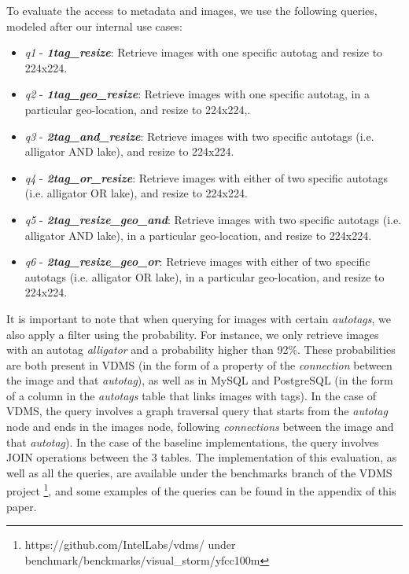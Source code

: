 To evaluate the access to metadata and images,
we use the following queries, modeled after our internal use cases:

\begin{itemize}
\item \textit{q1} - {\bf {\em 1tag\_resize}}: Retrieve images with one specific autotag and resize to 224x224.

\item \textit{q2} - {\bf {\em 1tag\_geo\_resize}}: Retrieve images with one specific autotag, in a particular geo-location, and resize to 224x224,.

\item \textit{q3} - {\bf {\em 2tag\_and\_resize}}: Retrieve images with two specific autotags (i.e. alligator AND lake), and resize to 224x224.

\item \textit{q4} - {\bf {\em 2tag\_or\_resize}}: Retrieve images with either of two specific autotags (i.e. alligator OR lake), and resize to 224x224.

\item \textit{q5} - {\bf {\em 2tag\_resize\_geo\_and}}: Retrieve images with two specific autotags (i.e. alligator AND lake), in a particular geo-location, and resize to 224x224.

\item \textit{q6} - {\bf {\em 2tag\_resize\_geo\_or}}: Retrieve images with either of two specific autotags (i.e. alligator OR lake), in a particular geo-location, and resize to 224x224.

\end{itemize}

It is important to note that when querying for images with certain
\textit{autotags}, we also apply a filter using the probability.
For instance, we only retrieve images with an autotag \textit{alligator}
and a probability higher than 92\%.
These probabilities are both present in VDMS (in the form of a property
of the \textit{connection} between the image and that \textit{autotag}),
as well as in MySQL and PostgreSQL (in the form of a column in the \textit{autotags} table
that links images with tags).
In the case of VDMS, the query involves a graph traversal query that starts
from the \textit{autotag} node and ends in the images node,
following \textit{connections} between the image and that \textit{autotag}).
In the case of the baseline implementations,
the query involves JOIN operations between the 3 tables.
The implementation of this evaluation, as well as all the queries, are available
under the benchmarks branch of the VDMS project
\footnote{https://github.com/IntelLabs/vdms/ under benchmark/benckmarks/visual\_storm/yfcc100m},
and some examples of the queries can be found in the appendix of this
paper.

